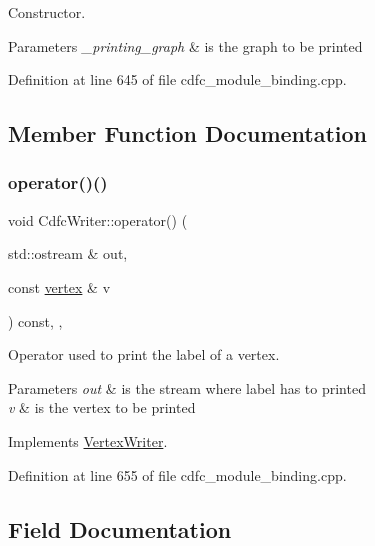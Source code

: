 Constructor. 


\begin{DoxyParams}{Parameters}
{\em \+\_\+printing\+\_\+graph} & is the graph to be printed \\
\hline
\end{DoxyParams}


Definition at line 645 of file cdfc\+\_\+module\+\_\+binding.\+cpp.



\subsection{Member Function Documentation}
\mbox{\label{classCdfcWriter_a8430da34044c0c57b7ccda0a2720dc04}} 
\subsubsection{\texorpdfstring{operator()()}{operator()()}}
{\footnotesize\ttfamily void Cdfc\+Writer\+::operator() (\begin{DoxyParamCaption}\item[{std\+::ostream \&}]{out,  }\item[{const \hyperlink{graph_8hpp_abefdcf0544e601805af44eca032cca14}{vertex} \&}]{v }\end{DoxyParamCaption}) const\hspace{0.3cm}{\ttfamily [inline]}, {\ttfamily [override]}, {\ttfamily [virtual]}}



Operator used to print the label of a vertex. 


\begin{DoxyParams}{Parameters}
{\em out} & is the stream where label has to printed \\
\hline
{\em v} & is the vertex to be printed \\
\hline
\end{DoxyParams}


Implements \hyperlink{classVertexWriter_a9df92a65d6e59d160be56eb8ec5cb84c}{Vertex\+Writer}.



Definition at line 655 of file cdfc\+\_\+module\+\_\+binding.\+cpp.



\subsection{Field Documentation}
\mbox{\label{classCdfcWriter_ae34942dd3bb12bc5b804fb4584eb8eed}} 

